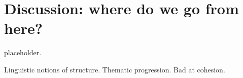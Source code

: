 \chapter{\label{chap:discussion} Discussion: where do we go from here?}
placeholder.


Linguistic notions of structure.
Thematic progression.
Bad at cohesion.
